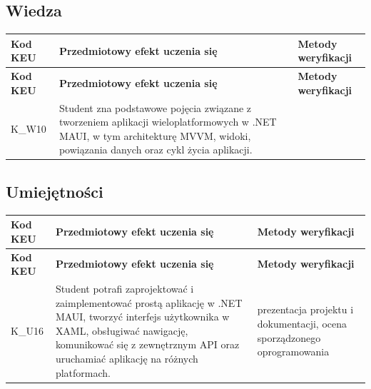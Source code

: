 \documentclass[12pt, a4paper]{article}
\newcommand{\thdrule}{\noalign{\global\setlength{\extrarowheight}{0pt}}}
\newcommand{\thdend}{\noalign{\global\setlength{\extrarowheight}{3pt}}}
\begin{document}
\subsection*{Wiedza}
{\scriptsize
\begin{longtable}{m{1.6cm}m{9.0cm}m{4.2cm}}
\thdrule\toprule
\rowcolor{pjatkRed} {\color{white}\footnotesize\textbf{\vphantom{Ag}Kod KEU}} & {\color{white}\footnotesize\textbf{\vphantom{Ag}Przedmiotowy efekt uczenia się}} & {\color{white}\footnotesize\textbf{\vphantom{Ag}Metody weryfikacji}} \\
\midrule\thdend
\endfirsthead
\thdrule\toprule
\rowcolor{pjatkRed} {\color{white}\footnotesize\textbf{\vphantom{Ag}Kod KEU}} & {\color{white}\footnotesize\textbf{\vphantom{Ag}Przedmiotowy efekt uczenia się}} & {\color{white}\footnotesize\textbf{\vphantom{Ag}Metody weryfikacji}} \\
\midrule\thdend
\endhead
  \rowcolor{tableRowLight} K\_W10 & Student zna podstawowe pojęcia związane z tworzeniem aplikacji wieloplatformowych w .NET MAUI, w tym architekturę MVVM, widoki, powiązania danych oraz cykl życia aplikacji. &  \\
\bottomrule
\end{longtable}}

\subsection*{Umiejętności}
{\scriptsize
\begin{longtable}{m{1.6cm}m{9.0cm}m{4.2cm}}
\thdrule\toprule
\rowcolor{pjatkRed} {\color{white}\footnotesize\textbf{\vphantom{Ag}Kod KEU}} & {\color{white}\footnotesize\textbf{\vphantom{Ag}Przedmiotowy efekt uczenia się}} & {\color{white}\footnotesize\textbf{\vphantom{Ag}Metody weryfikacji}} \\
\midrule\thdend
\endfirsthead
\thdrule\toprule
\rowcolor{pjatkRed} {\color{white}\footnotesize\textbf{\vphantom{Ag}Kod KEU}} & {\color{white}\footnotesize\textbf{\vphantom{Ag}Przedmiotowy efekt uczenia się}} & {\color{white}\footnotesize\textbf{\vphantom{Ag}Metody weryfikacji}} \\
\midrule\thdend
\endhead
  \rowcolor{tableRowLight} K\_U16 & Student potrafi zaprojektować i zaimplementować prostą aplikację w .NET MAUI, tworzyć interfejs użytkownika w XAML, obsługiwać nawigację, komunikować się z zewnętrznym API oraz uruchamiać aplikację na różnych platformach. & prezentacja projektu i dokumentacji, ocena sporządzonego oprogramowania \\
\bottomrule
\end{longtable}}
\end{document}
